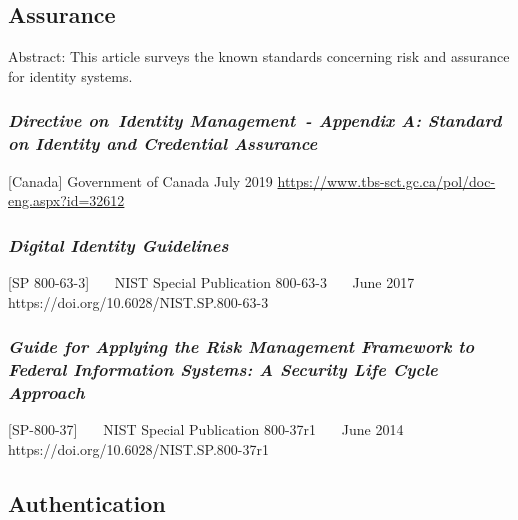 \hypertarget{assurance}{%
\subsection{Assurance}\label{assurance}}

Abstract: This article surveys the known standards concerning risk and
assurance for identity systems.

\hypertarget{directive-on-identity-management---appendix-a-standard-on-identity-and-credential-assurance}{%
\subsubsection{\texorpdfstring{\emph{Directive on~Identity Management~-
Appendix A: Standard on Identity and Credential
Assurance}}{Directive on~Identity Management~- Appendix A: Standard on Identity and Credential Assurance}}\label{directive-on-identity-management---appendix-a-standard-on-identity-and-credential-assurance}}

{[}Canada{]} Government of Canada July 2019
\url{https://www.tbs-sct.gc.ca/pol/doc-eng.aspx?id=32612}

\hypertarget{digital-identity-guidelines}{%
\subsubsection{\texorpdfstring{\emph{Digital Identity
Guidelines}}{Digital Identity Guidelines}}\label{digital-identity-guidelines}}

{[}SP 800-63-3{]}~~~ NIST Special Publication 800-63-3~~~ June 2017~~~
https://doi.org/10.6028/NIST.SP.800-63-3~~~

\hypertarget{guide-for-applying-the-risk-management-framework-to-federal-information-systems-a-security-life-cycle-approach}{%
\subsubsection{\texorpdfstring{\emph{Guide for Applying the Risk Management
Framework to Federal Information Systems: A Security Life Cycle
Approach}}{Guide for Applying the Risk Management Framework to Federal Information Systems: A Security Life Cycle Approach}}\label{guide-for-applying-the-risk-management-framework-to-federal-information-systems-a-security-life-cycle-approach}}

{[}SP-800-37{]}~~~ NIST Special Publication 800-37r1~~~ June 2014~~~
https://doi.org/10.6028/NIST.SP.800-37r1~~~

\hypertarget{authentication-1}{%
\subsection{Authentication}\label{authentication-1}}

